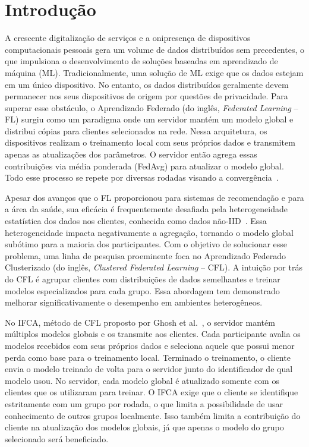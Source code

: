 \section{Introdução}

A crescente digitalização de serviços e a onipresença de dispositivos computacionais pessoais gera um volume de dados distribuídos sem precedentes,
o que impulsiona o desenvolvimento de soluções baseadas em aprendizado de máquina (ML).
Tradicionalmente, uma solução de ML exige que os dados estejam em um único dispositivo.
No entanto, os dados distribuídos geralmente devem permanecer nos seus dispositivos de origem por questões de privacidade.
Para superar esse obstáculo, o Aprendizado Federado (do inglês, \textit{Federated Learning} -- FL) surgiu como um paradigma
onde um servidor mantém um modelo global e distribui cópias para clientes selecionados na rede.
Nessa arquitetura, os dispositivos realizam o treinamento local com seus próprios dados e transmitem apenas as atualizações dos parâmetros.
O servidor então agrega essas contribuições via média ponderada (FedAvg) para atualizar o modelo global.
Todo esse processo se repete por diversas rodadas visando a convergência~\cite{mcmahan2017communication}.

Apesar dos avanços que o FL proporcionou para sistemas de recomendação e para a área da saúde,
sua eficácia é frequentemente desafiada pela heterogeneidade estatística dos dados nos clientes, conhecida como dados não-IID~\cite{hsu2019measuring}.
Essa heterogeneidade impacta negativamente a agregação, tornando o modelo global subótimo para a maioria dos participantes.
Com o objetivo de solucionar esse problema, uma linha de pesquisa proeminente foca no Aprendizado Federado Clusterizado
(do inglês, \textit{Clustered Federated Learning} -- CFL).
A intuição por trás do CFL é agrupar clientes com distribuições de dados semelhantes e treinar modelos especializados para cada grupo.
Essa abordagem tem demonstrado melhorar significativamente o desempenho em ambientes heterogêneos.

No IFCA, método de CFL proposto por Ghosh et al.~\cite{ifca},
o servidor mantém múltiplos modelos globais e os transmite aos clientes.
Cada participante avalia os modelos recebidos com seus próprios dados e seleciona aquele que possui menor perda como base para o treinamento local.
Terminado o treinamento, o cliente envia o modelo treinado de volta para o servidor junto do identificador de qual modelo usou.
No servidor, cada modelo global é atualizado somente com os clientes que os utilizaram para treinar.
O IFCA exige que o cliente se identifique estritamente com um grupo por rodada,
o que limita a possibilidade de usar conhecimento de outros grupos localmente.
Isso também limita a contribuição do cliente na atualização dos modelos globais,
já que apenas o modelo do grupo selecionado será beneficiado.

